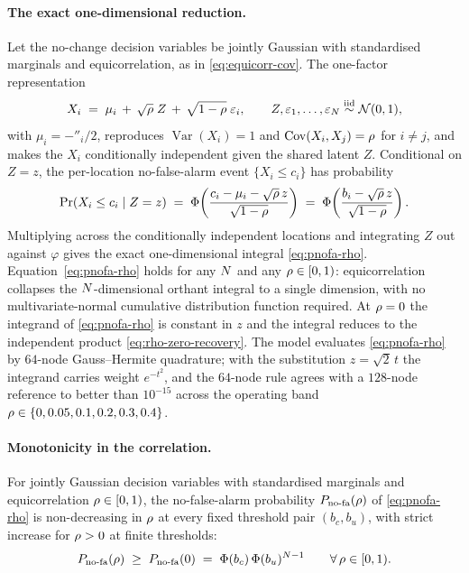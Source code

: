 \paragraph{The exact one-dimensional reduction.}
Let the no-change decision variables be jointly Gaussian with
standardised marginals and equicorrelation, as in
\eqref{eq:equicorr-cov}. The one-factor representation
\begin{equation}
  X_i \;=\; \mu_i \,+\, \sqrt{\rho}\;Z \,+\, \sqrt{1 - \rho}\;\varepsilon_i,
  \qquad
  Z, \varepsilon_1, \dots, \varepsilon_N
  \stackrel{\text{iid}}{\sim} \mathcal{N}(0, 1),
  \label{eq:one-factor}
\end{equation}
with $\mu_i = -\dprime_i/2$, reproduces $\operatorname{Var}(X_i) = 1$
and $\operatorname{Cov}(X_i, X_j) = \rho$ for $i \neq j$, and makes the
$X_i$ conditionally independent given the shared latent $Z$. Conditional
on $Z = z$, the per-location no-false-alarm event $\{X_i \le c_i\}$ has
probability
\begin{equation}
  \Pr(X_i \le c_i \mid Z = z)
  \;=\;
  \Phi\!\left(\frac{c_i - \mu_i - \sqrt{\rho}\,z}{\sqrt{1 - \rho}}\right)
  \;=\;
  \Phi\!\left(\frac{b_i - \sqrt{\rho}\,z}{\sqrt{1 - \rho}}\right).
  \label{eq:conditional-noFA}
\end{equation}
Multiplying across the conditionally independent locations and
integrating $Z$ out against $\varphi$ gives the exact one-dimensional
integral \eqref{eq:pnofa-rho}. Equation~\eqref{eq:pnofa-rho} holds for
any $N$ and any $\rho \in [0, 1)$: equicorrelation collapses the
$N$-dimensional orthant integral to a single dimension, with no
multivariate-normal cumulative distribution function required. At
$\rho = 0$ the integrand of \eqref{eq:pnofa-rho} is constant in $z$ and
the integral reduces to the independent product
\eqref{eq:rho-zero-recovery}. The model evaluates
\eqref{eq:pnofa-rho} by $64$-node Gauss--Hermite quadrature; with the
substitution $z = \sqrt{2}\,t$ the integrand carries weight $e^{-t^2}$,
and the $64$-node rule agrees with a $128$-node reference to better than
$10^{-15}$ across the operating band $\rho \in
\{0, 0.05, 0.1, 0.2, 0.3, 0.4\}$.

\paragraph{Monotonicity in the correlation.}
\begin{proposition}
\label{prop:orthant-monotone}
For jointly Gaussian decision variables with standardised marginals and
equicorrelation $\rho \in [0, 1)$, the no-false-alarm probability
$P_{\mathrm{no\text{-}fa}}(\rho)$ of \eqref{eq:pnofa-rho} is non-decreasing in $\rho$ at
every fixed threshold pair $(b_c, b_u)$, with strict increase for
$\rho > 0$ at finite thresholds:
\begin{equation}
  P_{\mathrm{no\text{-}fa}}(\rho) \;\ge\; P_{\mathrm{no\text{-}fa}}(0)
  \;=\; \Phi(b_c)\,\Phi(b_u)^{N - 1}
  \qquad \forall\,\rho \in [0, 1).
  \label{eq:orthant-monotone}
\end{equation}
\end{proposition}

